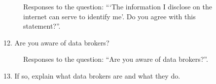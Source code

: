 \begin{figure}[H]
    \begin{center}
        \caption{Responses to the question: ```The information I disclose on the internet can serve to identify me'. Do you agree with this statement?''.}
        \label{fig:survey_s5_q11}
    \end{center}
\end{figure}

12. Are you aware of data brokers?

\begin{figure}[H]
    \centering
    \caption{Responses to the question: ``Are you aware of data brokers?''.}
    \label{fig:survey_s5_q12}
\end{figure}

13. If so, explain what data brokers are and what they do.

